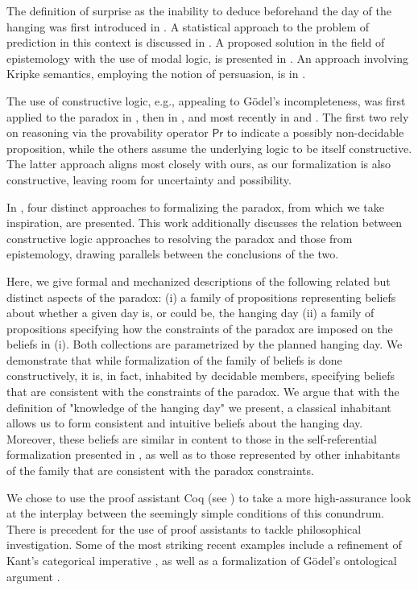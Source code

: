 \documentclass[runningheads]{llncs}
\begin{document}
The definition of surprise as the inability to deduce beforehand the day of the hanging
was first introduced in \cite{prediction}. A statistical approach to the problem
of prediction in this context is discussed in \cite{statistical}.
A proposed solution in the field of epistemology with the use of modal
logic, is presented in \cite{modalepistemic}. An approach involving
Kripke semantics, employing the notion of persuasion, is in \cite{kripkemodal}.

The use of constructive logic,
e.g., appealing to G\"{o}del's incompleteness, was first applied to the
paradox in \cite{goedelized}, then in \cite{godelinconsistent}, and most recently
in \cite{constructive} and \cite{nonpredet}. The first two rely on reasoning via the provability operator $\mathsf{Pr}$ to indicate
a possibly non-decidable proposition, while the others assume the underlying logic to be itself
constructive. The latter approach aligns most closely with ours, as our formalization
is also constructive, leaving room for uncertainty and possibility.

In \cite{fourpossible}, four distinct approaches to formalizing the
paradox, from which we take inspiration, are presented. This work additionally discusses the relation between
constructive logic approaches to resolving the paradox and those from epistemology, drawing parallels
between the conclusions of the two.

Here, we give formal and mechanized descriptions of the following
related but distinct aspects of the
paradox: (i) a family of propositions
representing beliefs about whether a given day is, or could be, the hanging day
(ii) a family of propositions specifying how the constraints of the
paradox are imposed on the beliefs in (i). Both collections are parametrized by
the planned hanging day. We demonstrate that while formalization of the
family of beliefs is done constructively, it is, in fact,
inhabited by decidable members, specifying beliefs that are consistent with the constraints of the paradox. We argue that
with the definition of "knowledge of the hanging day" we present,
a classical inhabitant allows us
to form consistent and intuitive beliefs about the hanging day.
Moreover, these beliefs are similar in content to those in the self-referential formalization presented
in \cite{godelinconsistent}, as well as to those represented by other inhabitants
of the family that are consistent with the paradox constraints.

We chose to use the proof
assistant Coq (see \cite{coqmanual}) to take a more high-assurance look at the
interplay between the seemingly simple conditions of this conundrum.
There is precedent for the use of proof assistants to tackle philosophical
investigation. Some of the most striking recent examples
include a refinement of Kant's categorical imperative \cite{categoricalkant},
as well as a formalization of G\"{o}del's ontological argument \cite{ontological}.
\end{document}

